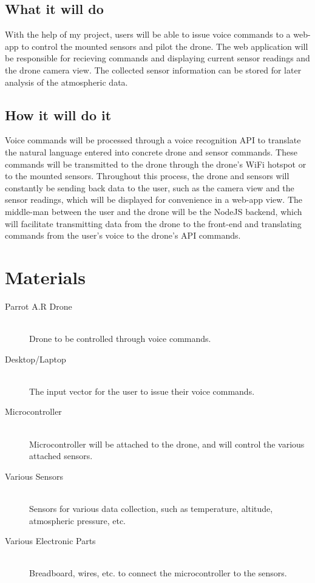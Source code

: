 \documentclass{article}
\begin{document}
	\subsection{What it will do}
	With the help of my project, users will be able to issue voice commands to a web-app to control the mounted sensors and pilot the drone. The web application will be responsible for recieving commands and displaying current sensor readings and the drone camera view. The collected sensor information can be stored for later analysis of the atmospheric data. 
	\subsection{How it will do it}
	Voice commands will be processed through a voice recognition API to translate the natural language entered into concrete drone and sensor commands. These commands will be transmitted to the drone through the drone's WiFi hotspot or to the mounted sensors. Throughout this process, the drone and sensors will constantly be sending back data to the user, such as the camera view and the sensor readings, which will be displayed for convenience in a web-app view. The middle-man between the user and the drone will be the NodeJS backend, which will facilitate transmitting data from the drone to the front-end and translating commands from the user's voice to the drone's API commands.  

	\section{Materials}
	\begin{description}
	  \item[Parrot A.R Drone] \hfill \\
	  Drone to be controlled through voice commands. 
	  \item[Desktop/Laptop] \hfill \\
	  The input vector for the user to issue their voice commands. 
	  \item[Microcontroller] \hfill \\
	  Microcontroller will be attached to the drone, and will control the various attached sensors. 
	  \item[Various Sensors] \hfill \\
	  Sensors for various data collection, such as temperature, altitude, atmospheric pressure, etc.
	  \item[Various Electronic Parts] \hfill \\
	  Breadboard, wires, etc. to connect the microcontroller to the sensors. 
	\end{description}
\end{document}
